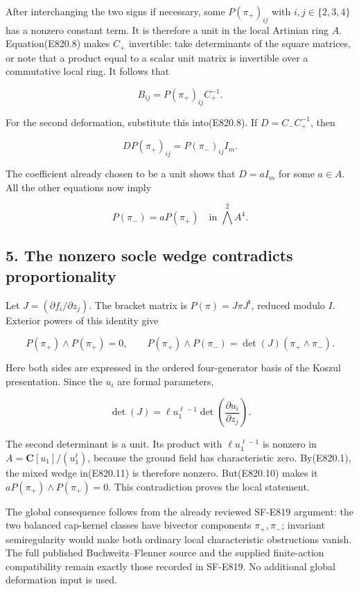 After interchanging the two signs if necessary, some \(P(\pi_+)_{ij}\)
with \(i,j\in\{2,3,4\}\) has a nonzero constant term. It is therefore a
unit in the local Artinian ring \(A\). Equation(E820.8) makes \(C_+\)
invertible: take determinants of the square matrices, or note that a
product equal to a scalar unit matrix is invertible over a commutative
local ring. It follows that

\[
 B_{ij}=P(\pi_+)_{ij}C_+^{-1}.
 \tag{E820.9}
\]

For the second deformation, substitute this into(E820.8). If
\(D=C_-C_+^{-1}\), then

\[
 D P(\pi_+)_{ij}=P(\pi_-)_{ij}I_m.
\]

The coefficient already chosen to be a unit shows that \(D=a I_m\) for
some \(a\in A\). All the other equations now imply

\[
 P(\pi_-)=a P(\pi_+)
       \quad\text{in }\bigwedge^2 A^4.
 \tag{E820.10}
\]

\subsection{5. The nonzero socle wedge contradicts
proportionality}\label{SF-E820-the-nonzero-socle-wedge-contradicts-proportionality}

Let \(J=(\partial f_i/\partial z_j)\). The bracket matrix is
\(P(\pi)=J\pi J^{\mathsf t}\), reduced modulo \(I\). Exterior powers of
this identity give

\[
 P(\pi_+)\wedge P(\pi_+)=0,
 \qquad
 P(\pi_+)\wedge P(\pi_-)
   =\det(J)(\pi_+\wedge\pi_-).
 \tag{E820.11}
\]

Here both sides are expressed in the ordered four-generator basis of the
Koszul presentation. Since the \(u_i\) are formal parameters,

\[
 \det(J)=\ell u_1^{\ell-1}
      \det\left(\frac{\partial u_i}{\partial z_j}\right).
 \tag{E820.12}
\]

The second determinant is a unit. Its product with \(\ell u_1^{\ell-1}\)
is nonzero in \(A=\mathbf C[u_1]/(u_1^\ell)\), because the ground field
has characteristic zero. By(E820.1), the mixed wedge in(E820.11) is
therefore nonzero. But(E820.10) makes it
\(a P(\pi_+)\wedge P(\pi_+)=0\). This contradiction proves the local
statement.

The global consequence follows from the already reviewed SF-E819
argument: the two balanced cap-kernel classes have bivector components
\(\pi_+,\pi_-\); invariant semiregularity would make both ordinary local
characteristic obstructions vanish. The full published
Buchweitz--Flenner source and the supplied finite-action compatibility
remain exactly those recorded in SF-E819. No additional global
deformation input is used.

